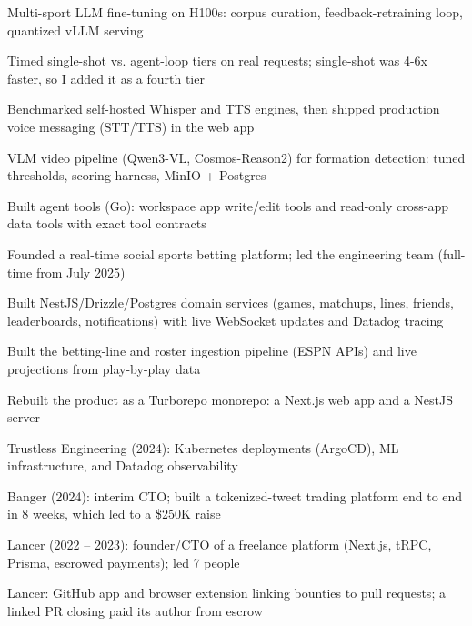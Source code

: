 \documentclass[print]{jack-resume}
\begin{document}
\begin{tightemize}
    \item Multi-sport LLM fine-tuning on H100s: corpus curation, feedback-retraining loop, quantized vLLM serving
    \item Timed single-shot vs. agent-loop tiers on real requests; single-shot was 4-6x faster, so I added it as a fourth tier
    \item Benchmarked self-hosted Whisper and TTS engines, then shipped production voice messaging (STT/TTS) in the web app
    \item VLM video pipeline (Qwen3-VL, Cosmos-Reason2) for formation detection: tuned thresholds, scoring harness, MinIO + Postgres
    \item Built agent tools (Go): workspace app write/edit tools and read-only cross-app data tools with exact tool contracts
\end{tightemize}
\sectionsep

\begin{tightemize}
    \item Founded a real-time social sports betting platform; led the engineering team (full-time from July 2025)
    \item Built NestJS/Drizzle/Postgres domain services (games, matchups, lines, friends, leaderboards, notifications) with live WebSocket updates and Datadog tracing
    \item Built the betting-line and roster ingestion pipeline (ESPN APIs) and live projections from play-by-play data
    \item Rebuilt the product as a Turborepo monorepo: a Next.js web app and a NestJS server
\end{tightemize}
\sectionsep

\begin{tightemize}
    \item Trustless Engineering (2024): Kubernetes deployments (ArgoCD), ML infrastructure, and Datadog observability
    \item Banger (2024): interim CTO; built a tokenized-tweet trading platform end to end in 8 weeks, which led to a \$250K raise
    \item Lancer (2022 -- 2023): founder/CTO of a freelance platform (Next.js, tRPC, Prisma, escrowed payments); led 7 people
    \item Lancer: GitHub app and browser extension linking bounties to pull requests; a linked PR closing paid its author from escrow
\end{tightemize}
\sectionsep
\end{document}
